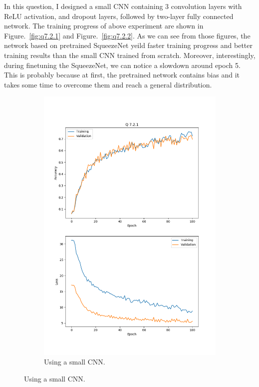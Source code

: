 \documentclass[11pt]{article}
\begin{document}
In this question, I designed a small CNN containing 3 convolution layers with ReLU activation, and dropout layers, followed by two-layer fully connected network.
The training progress of above experiment are shown in Figure.~\ref{fig:q7.2.1} and Figure.~\ref{fig:q7.2.2}.
As we can see from those figures, the network based on pretrained SqueezeNet yeild faster training progress and better training results than the small CNN trained from scratch.
Moreover, interestingly, during finetuning the SqueezeNet, we can notice a slowdown around epoch 5.
This is probably because at first, the pretrained network contains bias and it takes some time to overcome them and reach a general distribution.

\begin{figure}[h!]
    \begin{subfigure}{.495\textwidth}
      \centering
      \includegraphics[width=.9\linewidth]{../results/q7_2_1_17_small.png}
      \caption{Using a small CNN. }

\end{subfigure}
\end{figure}
\end{document}
